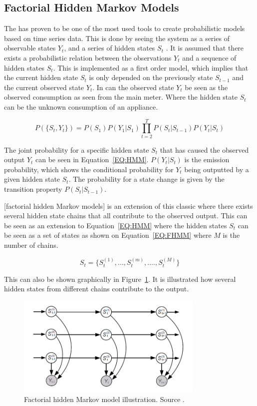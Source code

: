 \subsection{Factorial Hidden Markov Models}
The  has proven to be one of the most used tools to create probabilistic models based on time series data. This is done by seeing the system as a series of observable states $Y_t$, and a series of hidden states $S_t$ \citep{RefWorks:20}. It is assumed that there exists a probabilistic relation between the observations $Y_t$ and a sequence of hidden states $S_t$. This is implemented as a first order model, which implies that the current hidden state $S_t$ is only depended on the previously state $S_{t-1}$ and the current observed state $Y_t$. In  can the observed state $Y_t$ be seen as the observed consumption as seen from the main meter. Where the hidden state $S_t$ can be the unknown consumption of an appliance. 

\begin{equation}
	P(\{ S_t, Y_t \} ) = P(S_1)P(Y_1 | S_1) \prod_{t=2}^T P(S_t|S_{t-1})P(Y_t|S_t)
	\label{EQ:HMM}
\end{equation}

The joint probability for a specific hidden state $S_t$ that has caused the observed output $Y_t$ can be seen in Equation~\ref{EQ:HMM}. $P(Y_t|S_t)$ is the emission probability, which shows the conditional probability for $Y_t$ being outputted by a given hidden state $S_t$. The probability for a state change is given by the transition property $P(S_t|S_{t-1})$. 

[factorial hidden Markov models] is an extension of this classic  where there exists several hidden state chains that all contribute to the observed output. This can be seen as an extension to Equation~\ref{EQ:HMM} where the hidden states $S_t$ can be seen as a set of states as shown on Equation~\ref{EQ:FHMM} where $M$ is the number of chains.

\begin{equation}
	S_t = \{ S_t^{(1)}, ..., S_t^{(m)}, ...., S_t^{(M)} \}
	\label{EQ:FHMM}
\end{equation}

This can also be shown graphically in Figure~\ref{fig:FHMM}. It is illustrated how several hidden states from different chains contribute to the output. 

\begin{figure}[H]
\centering
\includegraphics[width=0.8\textwidth]{billeder/FHMM.png}
\caption[Factorial hidden Markov model illustration.]{Factorial hidden Markov model illustration. Source \citep{RefWorks:20}.}
\label{fig:FHMM}
\end{figure}

